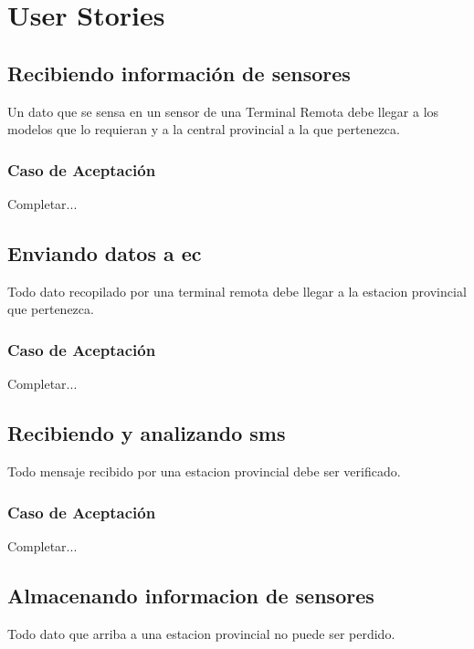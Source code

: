
\thispagestyle{empty}

\vspace{4cm plus 1cm minus 1cm}

\section{User Stories}

\linea \subsection*{Recibiendo información de sensores}
Un dato que se sensa en un sensor de una Terminal Remota debe llegar a los modelos que lo requieran y a la central provincial a la que pertenezca.
\subsubsection*{Caso de Aceptación}
Completar...

\linea \subsection*{Enviando datos a ec}
Todo dato recopilado por una terminal remota debe llegar a la estacion provincial que pertenezca.
\subsubsection*{Caso de Aceptación}
Completar...

\linea \subsection*{Recibiendo y analizando sms}
Todo mensaje recibido por una estacion provincial debe ser verificado.
\subsubsection*{Caso de Aceptación}
Completar...

\linea \subsection*{Almacenando informacion de sensores}
Todo dato que arriba a una estacion provincial no puede ser perdido.
